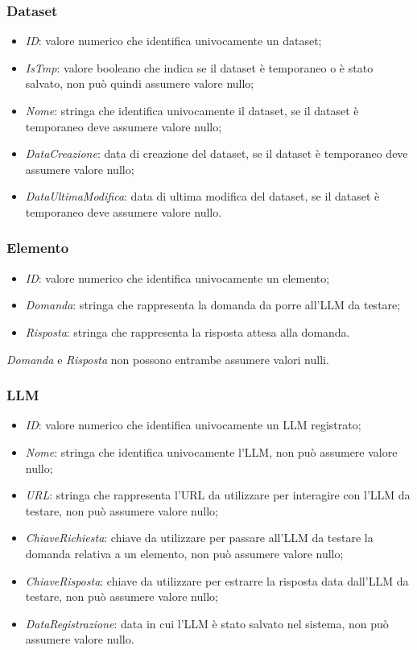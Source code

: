 \subsubsection{Dataset}
\begin{itemize}
    \item \textit{ID}: valore numerico che identifica univocamente un dataset;
    \item \textit{IsTmp}: valore booleano che indica se il dataset è temporaneo o è stato salvato, non può quindi assumere valore nullo;
    \item \textit{Nome}: stringa che identifica univocamente il dataset, se il dataset è temporaneo deve assumere valore nullo;
    \item \textit{DataCreazione}: data di creazione del dataset, se il dataset è temporaneo deve assumere valore nullo;
    \item \textit{DataUltimaModifica}: data di ultima modifica del dataset, se il dataset è temporaneo deve assumere valore nullo.
\end{itemize}

\subsubsection{Elemento}
\begin{itemize}
    \item \textit{ID}: valore numerico che identifica univocamente un elemento;
    \item \textit{Domanda}: stringa che rappresenta la domanda da porre all'LLM da testare;
    \item \textit{Risposta}: stringa che rappresenta la risposta attesa alla domanda.
\end{itemize}
\textit{Domanda} e \textit{Risposta} non possono entrambe assumere valori nulli.

\subsubsection{LLM}
\begin{itemize}
    \item \textit{ID}: valore numerico che identifica univocamente un LLM registrato;
    \item \textit{Nome}: stringa che identifica univocamente l'LLM, non può assumere valore nullo;
    \item \textit{URL}: stringa che rappresenta l'URL da utilizzare per interagire con l'LLM da testare, non può assumere valore nullo;
    \item \textit{ChiaveRichiesta}: chiave da utilizzare per passare all'LLM da testare la domanda relativa a un elemento, non può assumere valore nullo;
    \item \textit{ChiaveRisposta}: chiave da utilizzare per estrarre la risposta data dall'LLM da testare, non può assumere valore nullo;
    \item \textit{DataRegistrazione}: data in cui l'LLM è stato salvato nel sistema, non può assumere valore nullo.
\end{itemize}

